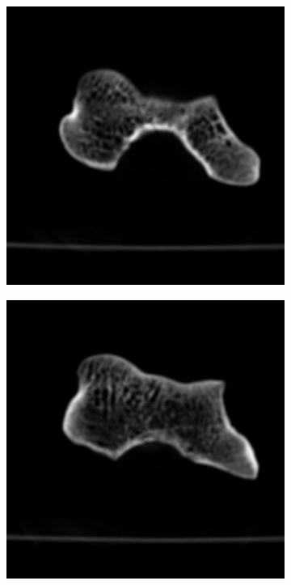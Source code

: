 \documentclass[journal]{IEEEtran}
\begin{document}
\begin{figure}[!h]
{\begin{subfigure}[b]{0.155\linewidth}
        \caption{}
     \end{subfigure}
\begin{subfigure}[b]{0.155\linewidth}
        \includegraphics[width=1\textwidth]{../images/humerus/humerus_template3.png}
        \caption{}
     \end{subfigure}
\begin{subfigure}[b]{0.155\linewidth}
        \includegraphics[width=1\textwidth]{../images/humerus/humerus_template4.png}

\end{subfigure}}
\end{figure}
\end{document}
